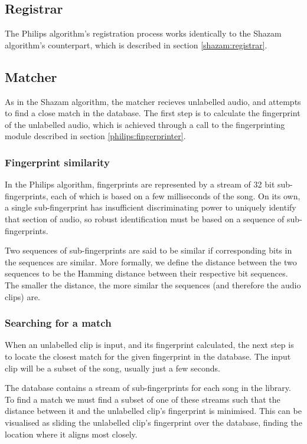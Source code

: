 \documentclass[12pt,a4paper,twoside,openright]{report}
\begin{document}
\subsection{Registrar}

The Philips algorithm's registration process works identically to the Shazam algorithm's counterpart, which is described in section \ref{shazam:registrar}.


\subsection{Matcher}
\label{philips:matcher}

As in the Shazam algorithm, the matcher recieves unlabelled audio, and attempts to find a close match in the database. The first step is to calculate the fingerprint of the unlabelled audio, which is achieved through a call to the fingerprinting module described in section \ref{philips:fingerprinter}.

\subsubsection{Fingerprint similarity}

In the Philips algorithm, fingerprints are represented by a stream of 32 bit sub-fingerprints, each of which is based on a few milliseconds of the song. On its own, a single sub-fingerprint has insufficient discriminating power to uniquely identify that section of audio, so robust identification must be based on a sequence of sub-fingerprints.

Two sequences of sub-fingerprints are said to be similar if corresponding bits in the sequences are similar. More formally, we define the distance between the two sequences to be the Hamming distance between their respective bit sequences. The smaller the distance, the more similar the sequences (and therefore the audio clips) are.


\subsubsection{Searching for a match}

When an unlabelled clip is input, and its fingerprint calculated, the next step is to locate the closest match for the given fingerprint in the database. The input clip will be a subset of the song, usually just a few seconds.

The database contains a stream of sub-fingerprints for each song in the library. To find a match we must find a subset of one of these streams such that the distance between it and the unlabelled clip's fingerprint is minimised. This can be visualised as sliding the unlabelled clip's fingerprint over the database, finding the location where it aligns most closely.
\end{document}
